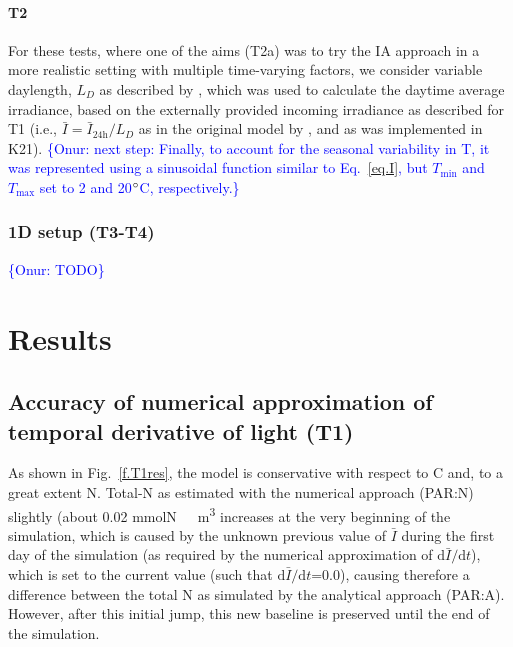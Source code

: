\documentclass[gmd, manuscript, draft]{copernicus}
\newcommand{\onur}[1]{\textcolor{blue}{\{Onur: #1\}}}
\begin{document}
    
    \paragraph{T2}
    For these tests, where one of the aims (T2a) was to try the IA approach in a more realistic setting with multiple time-varying factors, we consider variable daylength, $L_D$ as described by \citet{Forsythe2003}, which was used to calculate the daytime average irradiance, based on the externally provided incoming irradiance as described for T1 (i.e., $\bar{I}=\bar{I}_{\text{24h}}/L_D$ as in the original model by \citep{Pahlowetal13}, and as was implemented in K21). \onur{next step: Finally, to account for the seasonal variability in T, it was represented using a sinusoidal function similar to Eq.~\ref{eq.I}, but $T_{\min}$ and $T_{\max}$ set to 2 and 20$^{\circ}$C, respectively.}
    
\subsubsection{1D setup (T3-T4)}
    \onur{TODO}





\section{Results}

\subsection{Accuracy of numerical approximation of temporal derivative of light (T1)}
As shown in Fig.~\ref{f.T1res}, the model is conservative with respect to C and, to a great extent N\@. Total-N as estimated with the numerical approach (PAR:N) slightly (about 0.02 \unit{mmolN\ m^3} increases at the very beginning of the simulation, which is caused by the unknown previous value of $\bar{I}$ during the first day of the simulation (as required by the numerical approximation of $\text{d}\bar{I}/\text{d}t$), which is set to the current value (such that $\text{d}\bar{I}/\text{d}t$=0.0), causing therefore a difference between the total N as simulated by the analytical approach (PAR:A). However, after this initial jump, this new baseline is preserved until the end of the simulation.
\end{document}
